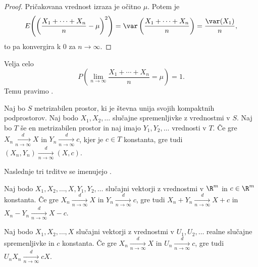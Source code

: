 \begin{proof}
  Pričakovana vrednost izraza je očitno $\mu$.
  Potem je
  \[
	E\!\left({\left( \frac{X_1 + \cdots + X_n}{n} - \mu \right)}^2\right)
	= \var\left(\frac{X_1 + \cdots + X_n}{n}\right)
	= \frac{\var(X_1)}{n},
  \]
  to pa konvergira k $0$ za $n \to \infty$.
\end{proof}


\begin{opomba}
  Velja celo
  \[
	P\!\left( \lim_{n \to \infty} \frac{X_1 + \cdots + X_n}{n} = \mu \right) = 1.
  \]
  Temu pravimo .
\end{opomba}

\begin{izrek}
  Naj bo $S$ metrizabilen prostor, ki je števna unija svojih kompaktnih
  podprostorov.
  Naj bodo $X_1, X_2, \ldots$ slučajne spremenljivke z vrednostmi v $S$.
  Naj bo $T$ še en metrizabilen prostor in naj imajo $Y_1, Y_2, \ldots$
  vrednosti v $T$.
  Če gre $X_n \xrightarrow[n \to \infty]{d} X$ in $Y_n \xrightarrow[n \to
  \infty]{d} c$, kjer je $c \in T$ konstanta, gre tudi $(X_n, Y_n)
  \xrightarrow[n \to \infty]{d} (X, c)$.
\end{izrek}


Naslednje tri trditve se imenujejo .

\begin{posledica}
  Naj bodo $X_1, X_2, \ldots, X, Y_1, Y_2, \ldots$ slučajni vektorji z
  vrednostmi v $\R^m$ in $c \in \R^m$ konstanta.
  Če gre $X_n \xrightarrow[n \to \infty]{d} X$ in $Y_n \xrightarrow[n \to
  \infty]{d} c$, gre tudi $X_n + Y_n \xrightarrow[n \to \infty]{d} X+c$ in $X_n
  - Y_n \xrightarrow[n \to \infty]{d} X-c$.
\end{posledica}

\begin{posledica}
  Naj bodo $X_1, X_2, \ldots, X$ slučajni vektorji z vrednostmi v $U_1, U_2,
  \ldots$ realne slučajne spremenljivke in $c$ konstanta.
  Če gre $X_n \xrightarrow[n \to \infty]{d} X$ in $U_n \xrightarrow[n \to
  \infty]{d} c$, gre tudi $U_n X_n \xrightarrow[n \to \infty]{d} cX$.
\end{posledica}

